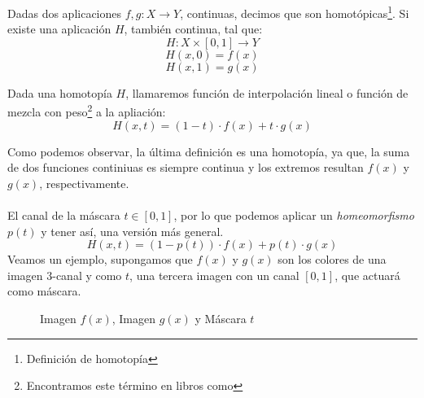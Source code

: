 \begin{definition}
    Dadas dos aplicaciones \(f, g:X\longrightarrow Y\), continuas, decimos que son homotópicas\footnote{Definición de homotopía}. Si existe una aplicación \(H\), también continua, tal que:
    \[ H:X\times[0,1]\longrightarrow Y \]
    \[ H(x, 0)=f(x) \]
    \[ H(x, 1)=g(x) \]
\end{definition}
\begin{definition}
    Dada una homotopía \(H\), llamaremos función de interpolación lineal o función de mezcla con peso\footnote{Encontramos este término en libros como} a la apliación:
    \[H(x, t)=(1-t)\cdot f(x) + t\cdot g(x)\]
\end{definition}
Como podemos observar,  la última definición es una homotopía, ya que, la suma de dos funciones continiuas es siempre continua y los extremos resultan \(f(x)\) y \(g(x)\), respectivamente.\\\\
El canal de la máscara \(t\in[0,1]\), por lo que podemos aplicar un \textit{homeomorfismo} \(p(t)\) y tener así, una versión más general.
    \[H(x, t)=(1-p(t))\cdot f(x) + p(t)\cdot g(x)\]
Veamos un ejemplo, supongamos que \(f(x)\) y \(g(x)\) son los colores de una imagen 3-canal y como \(t\), una tercera imagen con un canal \([0,1]\), que actuará como máscara.
\begin{figure}[H]
  \centering
  \captionsetup{justification=centering}%
  \hfill
  \hfill
  \caption{Imagen \(f(x)\), Imagen \(g(x)\) y Máscara \(t\)}
\end{figure}

